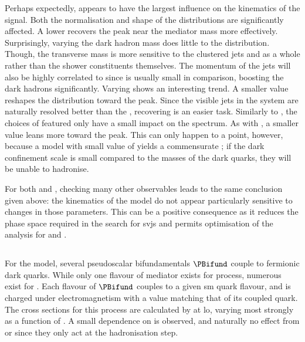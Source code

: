 Perhaps expectedly, \mZprime appears to have the largest influence on the kinematics of the signal. Both the normalisation and shape of the distributions are significantly affected. A lower \mZprime recovers the peak near the mediator mass more effectively. Surprisingly, varying the dark hadron mass does little to the distribution. Though, the transverse mass is more sensitive to the clustered \glspl{jet} and \ptmiss as a whole rather than the shower constituents themselves. The momentum of the \glspl{jet} will also be highly correlated to \mZprime since \mDark is usually small in comparison, boosting the dark hadrons significantly. Varying \rinv shows an interesting trend. A smaller value reshapes the \mT distribution toward the \mZprime peak. Since the visible \glspl{jet} in the system are naturally resolved better than the \ptvecmiss, recovering \mZprime is an easier task. Similarly to \mDark, the choices of \aDark featured only have a small impact on the \mT spectrum. As with \rinv, a smaller value leans more toward the \mZprime peak. This can only happen to a point, however, because a model with small value of \aDark yields a commensurate \lamDark; if the dark confinement scale is small compared to the masses of the dark quarks, they will be unable to hadronise.

For both \mDark and \aDark, checking many other observables leads to the same conclusion given above: the kinematics of the model do not appear particularly sensitive to changes in those parameters. This can be a positive consequence as it reduces the phase space required in the search for \glspl{svj} and permits optimisation of the analysis for \mZprime and \rinv.




\subsection{\texorpdfstring{\tchannel}{t-channel}}
\label{subsec:svj_signal_madgraph_tchannel}

For the \tchannel model, several pseudoscalar bifundamentals $\PBifund$ couple to fermionic dark quarks. While only one flavour of mediator exists for \schannel process, numerous exist for \tchannel. Each flavour of $\PBifund$ couples to a given \acrshort{sm} quark flavour, and is charged under electromagnetism with a value matching that of its coupled quark. The cross sections for this process are calculated by \madgraph at \acrshort{lo}, varying most strongly as a function of \mBifund. A small dependence on \mqdark is observed, and naturally no effect from \aDark or \rinv since they only act at the hadronisation step.

